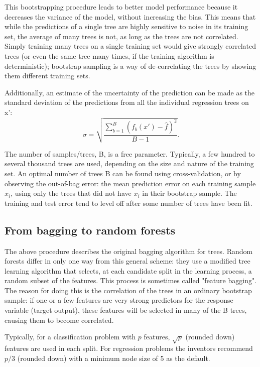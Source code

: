 \documentclass[document.tex]{subfiles}
\begin{document}
\begin{appendices}
        This bootstrapping procedure leads to better model performance because it decreases the variance of the model, without increasing the bias. This means that while the predictions of a single tree are highly sensitive to noise in its training set, the average of many trees is not, as long as the trees are not correlated. Simply training many trees on a single training set would give strongly correlated trees (or even the same tree many times, if the training algorithm is deterministic); bootstrap sampling is a way of de-correlating the trees by showing them different training sets.
        
        Additionally, an estimate of the uncertainty of the prediction can be made as the standard deviation of the predictions from all the individual regression trees on x':
        \begin{equation}
        	{\displaystyle \sigma ={\sqrt {\frac {\sum _{b=1}^{B}(f_{b}(x')-{\hat {f}})^{2}}{B-1}}}.}
        \end{equation}
        
        The number of samples/trees, B, is a free parameter. Typically, a few hundred to several thousand trees are used, depending on the size and nature of the training set. An optimal number of trees B can be found using cross-validation, or by observing the out-of-bag error: the mean prediction error on each training sample $x_i$, using only the trees that did not have $x_i$ in their bootstrap sample. The training and test error tend to level off after some number of trees have been fit.
        
        \subsection{From bagging to random forests}
        The above procedure describes the original bagging algorithm for trees. Random forests differ in only one way from this general scheme: they use a modified tree learning algorithm that selects, at each candidate split in the learning process, a random subset of the features. This process is sometimes called "feature bagging". The reason for doing this is the correlation of the trees in an ordinary bootstrap sample: if one or a few features are very strong predictors for the response variable (target output), these features will be selected in many of the B trees, causing them to become correlated.
        
        Typically, for a classification problem with $p$ features, $\sqrt{p}$ (rounded down) features are used in each split. For regression problems the inventors recommend $p/3$ (rounded down) with a minimum node size of 5 as the default.
\end{appendices}
\end{document}
